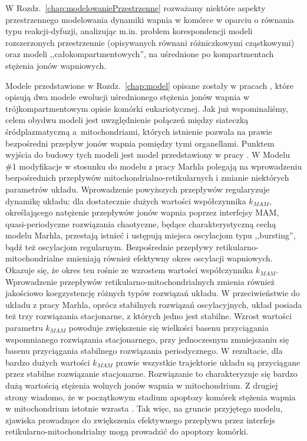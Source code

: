 W Rozdz.~\ref{chap:modelowaniePrzestrzenne}  rozważamy niektóre aspekty przestrzennego modelowania dynamiki wapnia w komórce w oparciu o równania typu reakcji-dyfuzji, analizując m.in. problem korespondencji modeli rozszerzonych przestrzennie (opisywanych równani różniczkowymi cząstkowymi) oraz modeli ,,całokompartmentowych'', na uśrednione po kompartmentach stężenia jonów wapniowych.  


Modele przedstawione w Rozdz.~\ref{chap:model} opisane zostały w pracach \cite{Dyzma2012,Szopa2013}, które opisują dwa modele ewolucji uśrednionego stężenia jonów wapnia w trójkompartmentowym opisie komórki eukariotycznej. Jak już wspominaliśmy, celem obydwu modeli jest uwzględnienie połączeń między siateczką śródplazmatyczną a~mitochondriami, których istnienie pozwala na prawie bezpośredni przepływ jonów wapnia pomiędzy tymi organellami. Punktem wyjścia do budowy tych modeli jest model przedstawiony w pracy \cite{Marhl2000}. W Modelu \#1 modyfikacje w stosunku do modelu z pracy Marhla polegają na wprowadzeniu bezpośrednich przepływów mitochondrialno-retikularnych i zmianie niektórych parametrów układu. Wprowadzenie powyższych przepływów regularyzuje dynamikę układu: dla dostatecznie dużych wartości współczynnika $k_{MAM}$, określającego natężenie przepływów jonów wapnia poprzez interfejsy MAM, quasi-periodyczne rozwiązania chaotyczne, będące charakterystyczną cechą modelu Marhla, przestają istnieć i ustępują miejsca oscylacjom typu ,,bursting'', bądź też oscylacjom regularnym. Bezpośrednie przepływy retikularno-mitochondrialne zmieniają również efektywny okres oscylacji wapniowych. Okazuje się, że okres ten rośnie ze wzrostem wartości współczynnika $k_{MAM}$. Wprowadzenie przepływów retikularno-mitochondrialnych zmienia również jakościowo koegzystencję różnych typów rozwiązań układu. W przeciwieństwie do układu z pracy Marhla, oprócz stabilnych rozwiązań oscylacyjnych, układ posiada też trzy rozwiązania  stacjonarne, z których jedno jest stabilne. Wzrost wartości parametru $k_{MAM}$ powoduje zwiększenie się wielkości basenu przyciągania wspomnianego rozwiązania stacjonarnego, przy jednoczesnym zmniejszaniu się basenu przyciągania stabilnego rozwiązania periodycznego. W rezultacie, dla bardzo dużych wartości $k_{MAM}$ prawie wszystkie trajektorie układu są przyciągane przez stabilne rozwiązanie stacjonarne. Rozwiązanie to charakteryzuje się bardzo dużą wartością stężenia wolnych jonów wapnia w mitochondrium. Z drugiej strony wiadomo, że w początkowym stadium apoptozy komórek stężenia wapnia w mitochondrium istotnie wzrasta \cite{Cali2012,Giorgi2012,Rasola2011}. Tak więc, na gruncie przyjętego modelu, zjawiska prowadzące do zwiększenia efektywnego przepływu przez interfejs retikularno-mitochondrialny mogą prowadzić do apoptozy komórki. 
 

